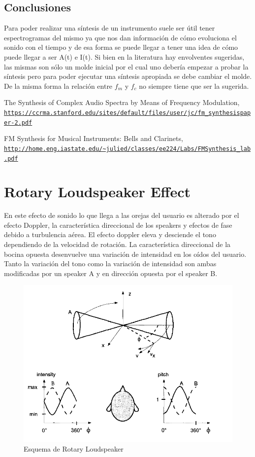 \documentclass[assd_tp2_main.tex]{subfiles}
\begin{document}
\subsection{Conclusiones}
Para poder realizar una síntesis de un instrumento suele ser útil tener espectrogramas del mismo ya que nos dan información de cómo evoluciona el sonido con el tiempo y de esa forma se puede llegar a tener una idea de cómo puede llegar a ser A(t) e I(t). Si bien en la literatura hay envolventes sugeridas, las mismas son sólo un molde inicial por el cual uno debería empezar a probar la síntesis pero para poder ejecutar una síntesis apropiada se debe cambiar el molde. De la misma forma la relación entre $f_m$ y $f_c$ no siempre tiene que ser la sugerida. 
\begin{thebibliography}{9}
  
The Synthesis of Complex Audio Spectra by Means of Frequency Modulation,
\\\texttt{\url{https://ccrma.stanford.edu/sites/default/files/user/jc/fm_synthesispaper-2.pdf}}

FM Synthesis for Musical Instruments: Bells and Clarinets,
\\\texttt{\url{http://home.eng.iastate.edu/~julied/classes/ee224/Labs/FMSynthesis_lab.pdf}}
\section{Rotary Loudspeaker Effect}
En este efecto de sonido lo que llega a las orejas del usuario es alterado por el efecto Doppler, la característica direccional de los speakers y  efectos de fase debido a turbulencia aérea. El efecto doppler eleva y desciende el tono dependiendo de la velocidad de rotación. La característica direccional de la bocina opuesta desenvuelve una variación de intensidad en los oídos del usuario. Tanto la variación del tono como la variación de intensidad son  ambas modificadas por un speaker A y en dirección opuesta por el speaker B.
\begin{figure}[H]
\centering
\includegraphics[width=0.4\linewidth]{graficos/EJ4/RotaryLoudspeaker.png}
\caption{Esquema de Rotary Loudspeaker}
\label{fig:RLesquema}
\end{figure}


\end{thebibliography}
\end{document}
